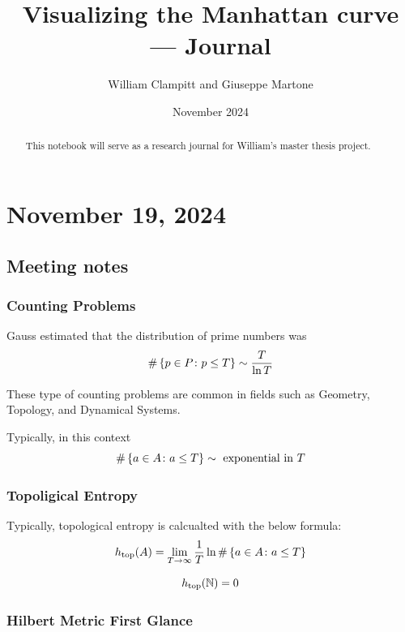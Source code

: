 \documentclass{amsart}
\title{Visualizing the Manhattan curve --- Journal}
\author{William Clampitt and Giuseppe Martone}
\date{November 2024}
\begin{document}
\begin{abstract}
    This notebook will serve as a research journal for William's master thesis project.
\end{abstract}

\maketitle
\tableofcontents

\section{November 19, 2024}
\subsection{Meeting notes}
\subsubsection{Counting Problems}
	Gauss estimated that the distribution of prime numbers was 
	\begin{equation*}
		\# \left\{p \in P \colon p \leq T\right\} \sim \frac{T}{\ln T} 
	\end{equation*}
	
	These type of counting problems are common in fields such as Geometry, Topology, and Dynamical Systems. 
	
	Typically, in this context
	\begin{equation*}
		\# \left\{ a \in A \colon a \leq T\right\} \sim \text{ exponential in } T
	\end{equation*}
	
	\subsubsection*{Topoligical Entropy}
	Typically, topological entropy is calcualted with the below formula:
	\begin{equation*}
		h_{\text{top}}(A) = \lim_{T \to \infty} \frac{1}{T} \ln \# \left\{a \in A \colon a \leq T\right\}
	\end{equation*}
	
	\begin{example*}
		\begin{equation*}
			h_{\text{top}}(\mathbb{N}) = 0
		\end{equation*}
	\end{example*}
	
	\subsubsection*{Hilbert Metric First Glance}
	
\end{document}
